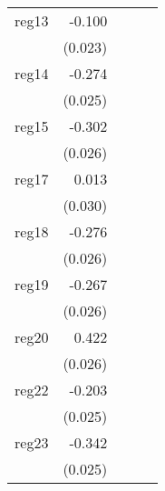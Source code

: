 {\begin{longtable}{l*{4}{D{.}{.}{-1}}}
\addlinespace
reg13       &      -0.100\sym{***}&                     &                     &                     \\
            &     (0.023)         &                     &                     &                     \\
\addlinespace
reg14       &      -0.274\sym{***}&                     &                     &                     \\
            &     (0.025)         &                     &                     &                     \\
\addlinespace
reg15       &      -0.302\sym{***}&                     &                     &                     \\
            &     (0.026)         &                     &                     &                     \\
\addlinespace
reg17       &       0.013         &                     &                     &                     \\
            &     (0.030)         &                     &                     &                     \\
\addlinespace
reg18       &      -0.276\sym{***}&                     &                     &                     \\
            &     (0.026)         &                     &                     &                     \\
\addlinespace
reg19       &      -0.267\sym{***}&                     &                     &                     \\
            &     (0.026)         &                     &                     &                     \\
\addlinespace
reg20       &       0.422\sym{***}&                     &                     &                     \\
            &     (0.026)         &                     &                     &                     \\
\addlinespace
reg22       &      -0.203\sym{***}&                     &                     &                     \\
            &     (0.025)         &                     &                     &                     \\
\addlinespace
reg23       &      -0.342\sym{***}&                     &                     &                     \\
            &     (0.025)         &                     &                     &                     \\

\end{longtable}}
